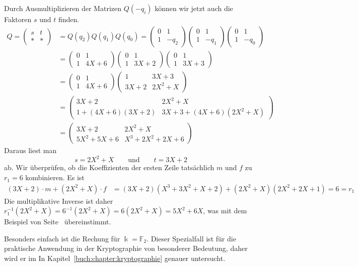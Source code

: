 \begin{beispiel}
Durch Ausmultiplizieren der Matrizen $Q(-q_i)$ können wir jetzt auch die 
Faktoren $s$ und $t$ finden.
\begin{align*}
Q=\begin{pmatrix}
s&t\\
*&*
\end{pmatrix}
&= Q(q_2)Q(q_1)Q(q_0)
=
\begin{pmatrix}0&1\\1&-q_2\end{pmatrix}
\begin{pmatrix}0&1\\1&-q_1\end{pmatrix}
\begin{pmatrix}0&1\\1&-q_0\end{pmatrix}
\\
&=
\begin{pmatrix}
0&1\\
1&4X+6
\end{pmatrix}
\begin{pmatrix}
0&1\\
1&3X+2
\end{pmatrix}
\begin{pmatrix}
0&1\\
1&3X+3
\end{pmatrix}
\\
&=
\begin{pmatrix}
0&1\\
1&4X+6
\end{pmatrix}
\begin{pmatrix}
   1&3X+3\\
3X+2&2X^2 + X
\end{pmatrix}
\\
&=
\begin{pmatrix}
3X+2           &2X^2+X\\
1+(4X+6)(3X+2) &3X+3 + (4X+6)(2X^2+X)
\end{pmatrix}
\\
&=
\begin{pmatrix}
     3X+2 & 2X^2     +X\\
5X^2+5X+6 &  X^3+2X^2+2X+6
\end{pmatrix}
\end{align*}
Daraus liest man
\[
s
=
2X^2+X
\qquad\text{und}\qquad
t
=
3X+2
\]
ab.
Wir überprüfen, ob die Koeffizienten der ersten Zeile tatsächlich $m$ und $f$
zu $r_1=6$ kombinieren.
Es ist
\begin{align*}
(3X+2)\cdot m + (2X^2+X)\cdot f
&= 
(3X+2)
(X^3+3X^2+X+2)
+
(2X^2+X)
(2X^2+2X+1)
=
6=r_1
\end{align*}
Die multiplikative Inverse ist daher
$
r_1^{-1}(2X^2 + X)
=
6^{-1}
(2X^2 + X)
=
6
(2X^2 + X)
=
5X^2+6X$,
was mit dem Beispiel von
Seite~\pageref{buch:endlichekoerper:beispiel:inversemitmatrix}
übereinstimmt.
\end{beispiel}

Besonders einfach ist die Rechung für $\Bbbk=\mathbb{F}_2$.
Dieser Spezialfall ist für die praktische Anwendung in der Kryptographie
von besonderer Bedeutung, daher wird er im 
In Kapitel~\ref{buch:chapter:kryptographie} genauer untersucht.

